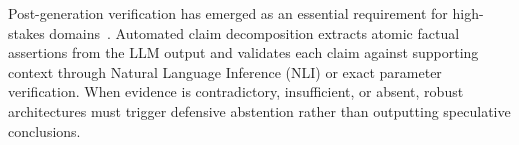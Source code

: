 Post-generation verification has emerged as an essential requirement for high-stakes domains~\cite{shuster2021retrieval,jiang2023active}. Automated claim decomposition extracts atomic factual assertions from the LLM output and validates each claim against supporting context through Natural Language Inference (NLI) or exact parameter verification. When evidence is contradictory, insufficient, or absent, robust architectures must trigger defensive abstention rather than outputting speculative conclusions.
